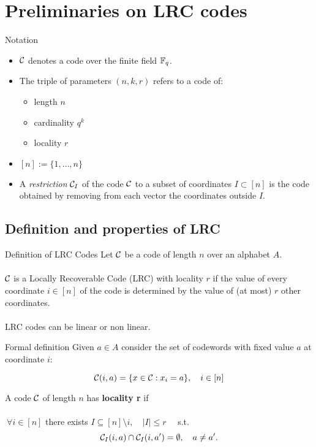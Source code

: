 \section{Preliminaries on LRC codes}

\begin{frame}{Notation}
    \begin{itemize}

	    \item $\mathcal{C}$ denotes a code over the finite field $\mathbb{F}_q$.
	    
	    \item The triple of parameters $(n,k,r)$ refers to a code of:
	    \begin{itemize}
	        \item length $n$
	        \item cardinality $q^k$
	        \item locality $r$
	    \end{itemize}
	    
	    \item $[n] := \{ 1, \dots , n\}$
	    
	    \item A \textit{restriction} $\mathcal{C}_I$ of the code $\mathcal{C}$ to a subset of coordinates $I \subset [n]$ is the code obtained by removing from each vector the coordinates outside $I$.
    \end{itemize}
\end{frame}

\subsection{Definition and properties of LRC}
\begin{frame}{Definition of LRC Codes}
 Let $\mathcal{C}$ be a code of length $n$ over an alphabet $A$. \\~\\
 
 $\mathcal{C}$ is a Locally Recoverable Code (LRC) with locality $r$ if the value of every coordinate $i \in [n]$ of the code is determined by the value of (at most) $r$ other coordinates. \\~\\

LRC codes can be linear or non linear.

\end{frame}


\begin{frame}{Formal definition}
    Given $a \in A$ consider the set of codewords with fixed value $a$ at coordinate $i$:

    $$ \mathcal{C} (i,a) = \{ x \in \mathcal{C} : x_i = a \}, \quad i \in [n] $$
    
    \begin{defn}
        A code $\mathcal{C}$ of length $n$ has \textbf{locality r} if \\~\\
        
         $\ \forall i \in [n ]$ there exists $I \subseteq [n] \setminus i, \quad \vert I \vert \leq r \quad $ s.t.         
        $$\mathcal{C}_{I} (i,a) \cap \mathcal{C}_{I} (i,a') = \emptyset, \quad a \neq a'.$$
    \end{defn}    
\end{frame}

